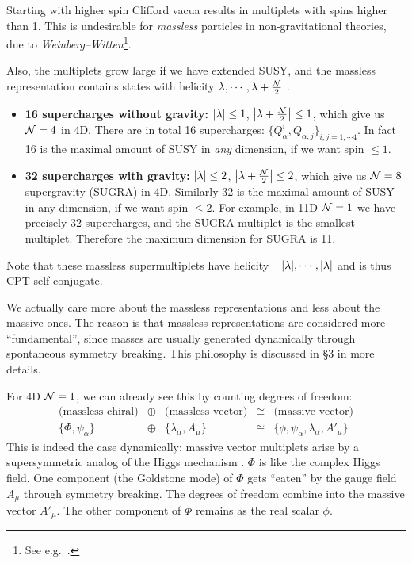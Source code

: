 \documentclass[a4paper
	,10pt
]{article}
\begin{document}
	Starting with higher spin Clifford vacua results in multiplets with spins higher than 1. This is undesirable for \textit{massless} particles in non-gravitational theories, due to \textit{Weinberg--Witten}\footnote{
		See e.g.\ . 
	}. 
	
	Also, the multiplets grow large if we have extended SUSY, and the massless representation contains states with helicity $\lambda,\cdots,\lambda + \frac{\mathcal{N}}{2}$ \cite{Terning:2006bq}. 
	
	\begin{itemize}
	\item \textbf{16 supercharges without gravity:} $\abs{\lambda} \le 1$, $\abs{\lambda + \frac{\mathcal{N}}{2}} \le 1$, which give us $\mathcal{N} = 4$ in 4D. There are in total 16 supercharges: $
		\{ Q^i_\alpha, \bar{Q}_{\dot{\alpha},j} \}_{i,j = 1,\cdots 4}
	$. In fact 16 is the maximal amount of SUSY in \textit{any} dimension, if we want spin $\le 1$. 
	
	\item \textbf{32 supercharges with gravity:} $\abs{\lambda} \le 2$, $\abs{\lambda + \frac{\mathcal{N}}{2}} \le 2$, which give us $\mathcal{N} = 8$ supergravity (SUGRA) in 4D. Similarly 32 is the maximal amount of SUSY in any dimension, if we want spin $\le 2$. For example, in 11D $\mathcal{N} = 1$ we have precisely 32 supercharges, and the SUGRA multiplet is the smallest multiplet. Therefore the maximum dimension for SUGRA is 11. 
	\end{itemize}
	Note that these massless supermultiplets have helicity $-\abs{\lambda},\cdots,\abs{\lambda}$ and is thus CPT self-conjugate. 
	
	\newparagraph
	We actually care more about the massless representations and less about the massive ones. The reason is that massless representations are considered more ``fundamental'', since masses are usually generated dynamically through spontaneous symmetry breaking. This philosophy is discussed in \S3 in more details. 
	
	For 4D $\mathcal{N} = 1$, we can already see this by counting degrees of freedom:
	\begin{equation}
	\begin{array}{ccccc}
		\text{(massless chiral)}
		&\oplus&
		\text{(massless vector)}
		&\cong&
		\text{(massive vector)}
	\\[1ex]
		\{\Phi, \psi_\alpha\}
		&\oplus&
		\{\lambda_\alpha, A_\mu\}
		&\cong&
		\{\phi,\psi_\alpha,\lambda_\alpha,A'_\mu\}
	\end{array}
	\end{equation}
	This is indeed the case dynamically: massive vector multiplets arise by a supersymmetric analog of the Higgs mechanism \cite{Argyres:1996abc}.
	$\Phi$ is like the complex Higgs field. One component (the Goldstone mode) of $\Phi$ gets ``eaten'' by the gauge field $A_\mu$ through symmetry breaking. The degrees of freedom combine into the massive vector $A'_\mu$. The other component of $\Phi$ remains as the real scalar $\phi$. 
	
\end{document}
